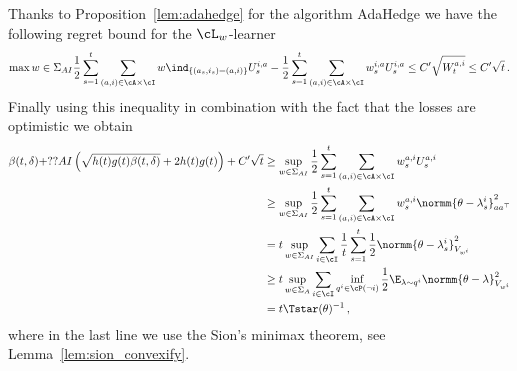 %
Thanks to Proposition~\ref{lem:adahedge} for the algorithm AdaHedge we have the following regret bound for the $\cL_w$-learner
\[
\max{w\in \Sigma_{AI}}\frac{1}{2}\sum_{s=1}^t\sum_{(a,i)\in\cA\times\cI} w \ind_{\{(a_s,i_s)=(a,i)\}}U_s^{i,a}- \frac{1}{2}\sum_{s=1}^t\sum_{(a,i)\in\cA\times\cI} w_s^{i,a}U_s^{i,a}\leq C'\sqrt{W^{a,i}_t}\leq C'\sqrt{t}\,.
\]
Finally using this inequality in combination with the fact that the losses are optimistic we obtain
\begin{align*}
  \beta(t,\delta) + ?? AI\left(\sqrt{h(t)g(t) \beta(t,\delta)}+ 2h(t)g(t)\right) +C'\sqrt{t} &\geq \sup_{w\in\Sigma_{AI}}\frac{1}{2}\sum_{s=1}^t\sum_{(a,i)\in\cA\times\cI} w_s^{a,i}U_s^{a,i}\\
  &\geq \sup_{w\in\Sigma_{AI}}\frac{1}{2}\sum_{s=1}^t\sum_{(a,i)\in\cA\times\cI} w_s^{a,i} \normm{\theta -\lambda_s^{i}}^2_{aa^\top}\\
  &= t \sup_{w\in\Sigma_ {AI}}\sum_{i\in\cI}\frac{1}{t}\sum_{s=1}^t\frac{1}{2}\normm{\theta -\lambda_s^{i}}^2_{V_{w^i}}\\
  &\geq t \sup_{w\in\Sigma_A}\sum_{i\in\cI} \inf_{q^i\in\cP(\neg i)} \frac{1}{2}\E_{\lambda\sim q^i}\normm{\theta -\lambda}^2_{V_{w^i}}\\
 &= t \Tstar(\theta)^{-1}\,,
\end{align*}
where in the last line we use the Sion's minimax theorem, see Lemma~\ref{lem:sion_convexify}.


